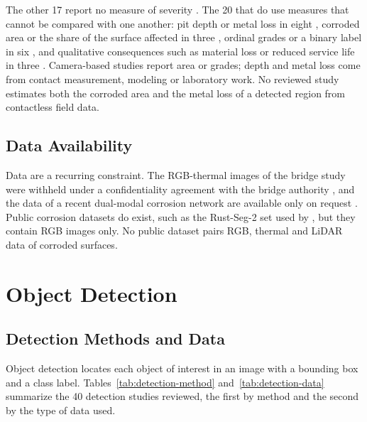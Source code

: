 The other 17 report no measure of severity
\citep{Li2022,Nash2022,Nguyen2026,Doshvarpassand2022,Lavadiya2022,Maharjan2025,Mao2026,PallasEnguita2025,Khodabux2020,Yu2023,HerndonTien2025,DeKerf2022,Liang2021,Espinoza2026,Alvani2026,Imran2025,Yao2019}.
The 20 that do use measures that cannot be compared with one another: pit depth
or metal loss in eight \citep{Liu2026,Wang2021,Qin2026,Egodawela2025,Akhlaghi2023,Huang2026a,Khodabux2021a,Yang2025}, corroded area or
the share of the surface affected in three \citep{Savino2025,Suzuki2026,Hu2023}, ordinal grades
or a binary label in six \citep{Bui2026,Hernndez-Surez2026,Rahman2021,Arias2025,Fu2024,Malashin2024}, and qualitative
consequences such as material loss or reduced service life in three
\citep{Elizalde2023,Wojciechowski2025,Yang2026a}. Camera-based studies report area or grades; depth and metal loss
come from contact measurement, modeling or laboratory work. No reviewed study
estimates both the corroded area and the metal loss of a detected region from
contactless field data.

\subsection{Data Availability}

Data are a recurring constraint. The RGB-thermal images of the bridge study were
withheld under a confidentiality agreement with the bridge authority \citep{Lim2021}, and
the data of a recent dual-modal corrosion network are available only on request
\citep{Mao2026}. Public corrosion datasets do exist, such as the Rust-Seg-2 set used by
\citep{Espinoza2026}, but they contain RGB images only. No public dataset pairs RGB, thermal
and LiDAR data of corroded surfaces.

\section{Object Detection}
\label{sec:lr-detection}

\subsection{Detection Methods and Data}

Object detection locates each object of interest in an image with a bounding box
and a class label. Tables~\ref{tab:detection-method} and~\ref{tab:detection-data}
summarize the 40 detection studies reviewed, the first by method and the second
by the type of data used.


